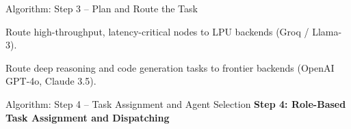 \documentclass[aspectratio=169,10pt]{beamer}
\newenvironment{algolist}{%
  \begin{list}{}{%
    \setlength{\labelwidth}{1.9em}%
    \setlength{\leftmargin}{2.1em}%
    \setlength{\itemindent}{0pt}%
    \setlength{\labelsep}{0.45em}%
    \setlength{\itemsep}{0.28em}%
    \setlength{\parsep}{0pt}%
    \setlength{\topsep}{0.1em}%
    \renewcommand{\makelabel}[1]{\textbf{\color{lavenderDark}##1}}%
  }\small%
}{\end{list}}
\newenvironment{algosublist}{%
  \begin{list}{}{%
    \setlength{\labelwidth}{2.4em}%
    \setlength{\leftmargin}{2.8em}%
    \setlength{\itemindent}{0pt}%
    \setlength{\labelsep}{0.4em}%
    \setlength{\itemsep}{0.14em}%
    \setlength{\parsep}{0pt}%
    \setlength{\topsep}{0.1em}%
    \renewcommand{\makelabel}[1]{\textbf{\color{lavenderMedium}##1}}%
  }\small%
}{\end{list}}
\begin{document}
\begin{frame}[t]{Algorithm: Step 3 -- Plan and Route the Task}
\begin{algolist}
    \vspace{0.15em}
    \begin{algosublist}
      \item[3.3.1] Route high-throughput, latency-critical nodes to LPU backends (Groq / Llama-3).
      \item[3.3.2] Route deep reasoning and code generation tasks to frontier backends (OpenAI GPT-4o, Claude 3.5).
    \end{algosublist}
\end{algolist}
\end{frame}

\begin{frame}[t]{Algorithm: Step 4 -- Task Assignment and Agent Selection}
\vspace{-0.15em}
{\large\bfseries\color{lavenderDark}Step 4: Role-Based Task Assignment and Dispatching}
\vspace{0.15em}


\end{frame}
\end{document}
